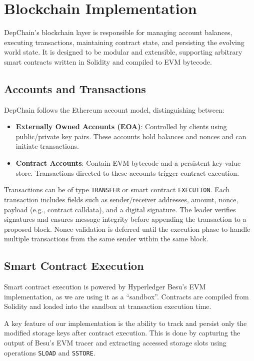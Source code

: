 \documentclass[runningheads]{llncs}
\begin{document}
\section{Blockchain Implementation}

DepChain’s blockchain layer is responsible for managing account balances, executing transactions, maintaining contract state, and persisting the evolving world state. It is designed to be modular and extensible, supporting arbitrary smart contracts written in Solidity and compiled to EVM bytecode.

\subsection{Accounts and Transactions}

DepChain follows the Ethereum account model, distinguishing between:
\begin{itemize}
    \item \textbf{Externally Owned Accounts (EOA)}: Controlled by clients using public/private key pairs. These accounts hold balances and nonces and can initiate transactions.
    \item \textbf{Contract Accounts}: Contain EVM bytecode and a persistent key-value store. Transactions directed to these accounts trigger contract execution.
\end{itemize}

Transactions can be of type \texttt{TRANSFER} or smart contract \texttt{EXECUTION}. Each transaction includes fields such as sender/receiver addresses, amount, nonce, payload (e.g., contract calldata), and a digital signature. The leader verifies signatures and ensures message integrity before appending the transaction to a proposed block. Nonce validation is deferred until the execution phase to handle multiple transactions from the same sender within the same block.

\subsection{Smart Contract Execution}

Smart contract execution is powered by Hyperledger Besu’s EVM implementation, as we are using it as a ``sandbox''. Contracts are compiled from Solidity and loaded into the sandbox at transaction execution time.

A key feature of our implementation is the ability to track and persist only the modified storage keys after contract execution. This is done by capturing the output of Besu’s EVM tracer and extracting accessed storage slots using operations \texttt{SLOAD} and \texttt{SSTORE}.
\end{document}
